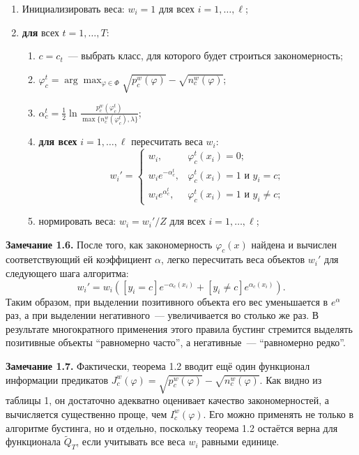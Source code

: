 \begin{enumerate}
    \item Инициализировать веса: $w_i = 1$ для всех $i = 1, \ldots, \ell$;
    \item \textbf{для} всех $t = 1, \ldots, T$:
          \begin{enumerate}
              \item $c = c_t$~--- выбрать класс, для которого будет строиться закономерность;
              \item $\varphi_c^t = \arg\max_{\varphi \in \Phi} \sqrt{p_c^w(\varphi)} - \sqrt{n_c^w(\varphi)}$;
              \item $\alpha_c^t = \frac{1}{2} \ln \frac{p_c^w(\varphi_c^t)}{\max\{n_c^w(\varphi_c^t), \lambda\}}$;
              \item \textbf{для всех} $i = 1, \ldots, \ell$ пересчитать веса $w_i$:
                    \[
                        w_i' =
                        \begin{cases}
                            w_i,                 & \varphi_c^t(x_i) = 0;                        \\
                            w_i e^{-\alpha_c^t}, & \varphi_c^t(x_i) = 1 \text{ и } y_i = c;     \\
                            w_i e^{\alpha_c^t},  & \varphi_c^t(x_i) = 1 \text{ и } y_i \neq c;
                        \end{cases}
                    \]
              \item нормировать веса: $w_i = w_i' / Z$ для всех $i = 1, \ldots, \ell$;
          \end{enumerate}
\end{enumerate}

\textbf{Замечание 1.6.} После того, как закономерность $\varphi_c(x)$ найдена и вычислен соответствующий ей коэффициент $\alpha$, легко пересчитать веса объектов $w_i'$ для следующего шага алгоритма:
\[
    w_i' = w_i \left( \left[ y_i = c \right] e^{-\alpha_c(x_i)} + \left[ y_i \neq c \right] e^{\alpha_c(x_i)} \right).
\]
Таким образом, при выделении позитивного объекта его вес уменьшается в $e^\alpha$ раз, а при выделении негативного~--- увеличивается во столько же раз. В результате многократного применения этого правила бустинг стремится выделять позитивные объекты ``равномерно часто'', а негативные~--- ``равномерно редко''.

\textbf{Замечание 1.7.} Фактически, теорема 1.2 вводит ещё один функционал информации предикатов $J_c^w(\varphi) = \sqrt{p_c^w(\varphi)} - \sqrt{n_c^w(\varphi)}$. Как видно из таблицы 1, он достаточно адекватно оценивает качество закономерностей, а вычисляется существенно проще, чем $I_c^w(\varphi)$. Его можно применять не только в алгоритме бустинга, но и отдельно, поскольку теорема 1.2 остаётся верна для функционала $\tilde{Q}_T$, если учитывать все веса $w_i$ равными единице.

